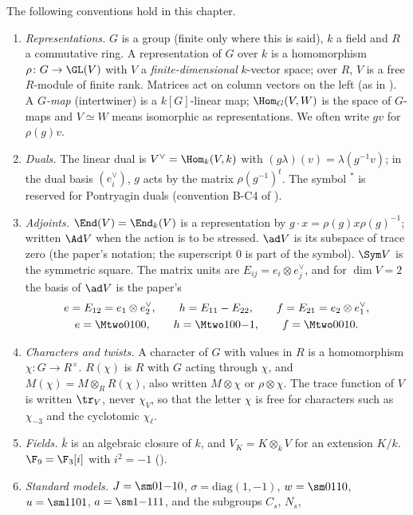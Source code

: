 \begin{convention}\label{conv:reps:conventions}
The following conventions hold in this chapter.
\begin{enumerate}[label=(C\arabic*)]
\item \emph{Representations.} $G$ is a group (finite only where this is said), $k$ a field and $R$ a commutative ring. A
representation of $G$ over $k$ is a homomorphism $\rho\colon G\to\GL(V)$ with $V$ a \emph{finite-dimensional} $k$-vector space;
over $R$, $V$ is a free $R$-module of finite rank. Matrices act on column vectors on the left (as in ). A
\emph{$G$-map} (intertwiner) is a $k[G]$-linear map; $\Hom_G(V,W)$ is the space of $G$-maps and $V\simeq W$ means isomorphic as
representations. We often write $gv$ for $\rho(g)v$.
\item \emph{Duals.} The linear dual is $V^\vee=\Hom_k(V,k)$ with $(g\lambda)(v)=\lambda(g^{-1}v)$; in the dual basis $(e_i^\vee)$, $g$ acts by the
matrix $\rho(g^{-1})^t$. The symbol ${}^*$ is reserved for Pontryagin duals (convention B-C4 of ).
\item \emph{Adjoints.} $\End(V)=\End_k(V)$ is a representation by $g\cdot x=\rho(g)x\rho(g)^{-1}$; written $\Ad V$ when the action is to be
stressed. $\ad V$ is its subspace of trace zero (the paper's notation; the superscript $0$ is part of the symbol). $\Sym V$ is the
symmetric square. The matrix units are $E_{ij}=e_i\otimes e_j^\vee$, and for $\dim V=2$ the basis of $\ad V$ is the paper's
\begin{gather*}
e=E_{12}=e_1\otimes e_2^\vee,\qquad h=E_{11}-E_{22},\qquad f=E_{21}=e_2\otimes e_1^\vee,\\
e=\Mtwo0100,\qquad h=\Mtwo100{-1},\qquad f=\Mtwo0010.
\end{gather*}
\item \emph{Characters and twists.} A character of $G$ with values in $R$ is a homomorphism $\chi\colon G\to R^\times$. $R(\chi)$ is $R$ with
$G$ acting through $\chi$, and $M(\chi)=M\otimes_RR(\chi)$, also written $M\otimes\chi$ or $\rho\otimes\chi$. The trace function of $V$ is written
$\tr_V$, never $\chi_V$, so that the letter $\chi$ is free for characters such as $\chi_{-3}$ and the cyclotomic $\chi_\ell$.
\item \emph{Fields.} $\bar k$ is an algebraic closure of $k$, and $V_K=K\otimes_kV$ for an extension $K/k$. $\F_9=\F_3[i]$ with $i^2=-1$
().
\item \emph{Standard models.} $J=\sm01{-1}0$, $\sigma=\mathrm{diag}(1,-1)$, $w=\sm0110$, $u=\sm1101$, $a=\sm1{-1}11$, and the subgroups $C_s$, $N_s$,

\end{enumerate}
\end{convention}
